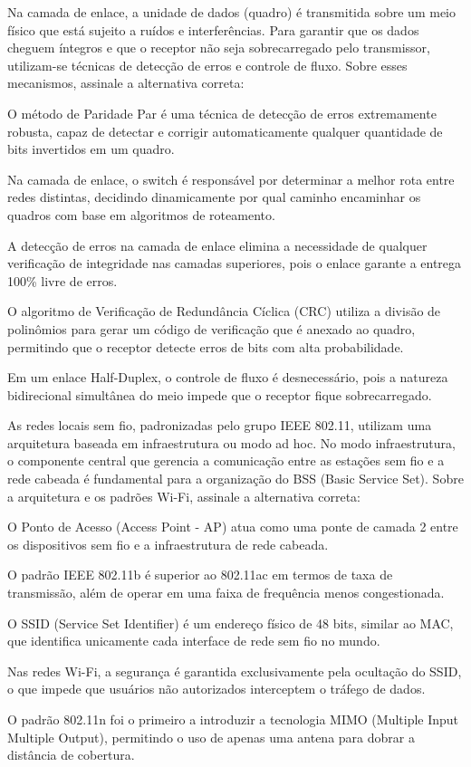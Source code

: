 \documentclass[11pt, addpoints]{modelo/prova2}
\begin{document}
\question[0.5] Na camada de enlace, a unidade de dados (quadro) é transmitida sobre um meio físico que está sujeito a ruídos e interferências. Para garantir que os dados cheguem íntegros e que o receptor não seja sobrecarregado pelo transmissor, utilizam-se técnicas de detecção de erros e controle de fluxo. Sobre esses mecanismos, assinale a alternativa correta:
    \begin{choices}
        \item O método de Paridade Par é uma técnica de detecção de erros extremamente robusta, capaz de detectar e corrigir automaticamente qualquer quantidade de bits invertidos em um quadro.
        \item Na camada de enlace, o switch é responsável por determinar a melhor rota entre redes distintas, decidindo dinamicamente por qual caminho encaminhar os quadros com base em algoritmos de roteamento.
        \item A detecção de erros na camada de enlace elimina a necessidade de qualquer verificação de integridade nas camadas superiores, pois o enlace garante a entrega 100\% livre de erros.
        \item O algoritmo de Verificação de Redundância Cíclica (CRC) utiliza a divisão de polinômios para gerar um código de verificação que é anexado ao quadro, permitindo que o receptor detecte erros de bits com alta probabilidade.
        \item Em um enlace Half-Duplex, o controle de fluxo é desnecessário, pois a natureza bidirecional simultânea do meio impede que o receptor fique sobrecarregado.
    \end{choices} 
\question[0.5] As redes locais sem fio, padronizadas pelo grupo IEEE 802.11, utilizam uma arquitetura baseada em infraestrutura ou modo ad hoc. No modo infraestrutura, o componente central que gerencia a comunicação entre as estações sem fio e a rede cabeada é fundamental para a organização do BSS (Basic Service Set). Sobre a arquitetura e os padrões Wi-Fi, assinale a alternativa correta:
    \begin{choices}
        \item O Ponto de Acesso (Access Point - AP) atua como uma ponte de camada 2 entre os dispositivos sem fio e a infraestrutura de rede cabeada.
        \item O padrão IEEE 802.11b é superior ao 802.11ac em termos de taxa de transmissão, além de operar em uma faixa de frequência menos congestionada.
        \item O SSID (Service Set Identifier) é um endereço físico de 48 bits, similar ao MAC, que identifica unicamente cada interface de rede sem fio no mundo.
        \item Nas redes Wi-Fi, a segurança é garantida exclusivamente pela ocultação do SSID, o que impede que usuários não autorizados interceptem o tráfego de dados.
        \item O padrão 802.11n foi o primeiro a introduzir a tecnologia MIMO (Multiple Input Multiple Output), permitindo o uso de apenas uma antena para dobrar a distância de cobertura.
    \end{choices} 
\end{document}
